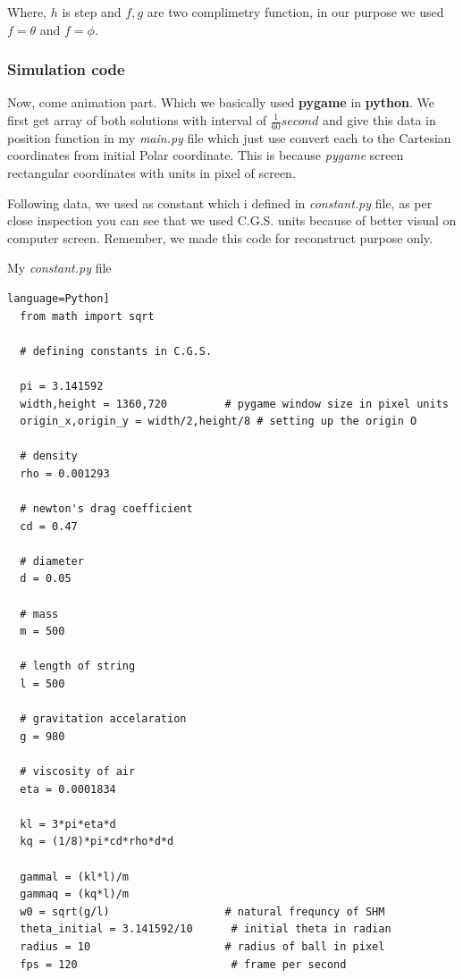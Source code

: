 \documentclass[11pt,a4paper]{article}
\begin{document}
Where, \(h\) is step and \(f,g\) are two complimetry function, in our purpose we used \(f = \theta\) and \(f = \phi\).





\subsubsection{Simulation code}
\label{sec:orga63b9eb}

Now, come animation part. Which we basically used \textbf{pygame} in \textbf{python}. We first get array of both solutions with interval of \(\frac{1}{60} second\) and give this data in position function in my \emph{main.py} file which just use convert each to the Cartesian coordinates from initial Polar coordinate. This is because \emph{pygame} screen rectangular coordinates with units in pixel of screen.

Following data, we used as constant which i defined in \emph{constant.py} file, as per close inspection you can see that we used C.G.S. units because of better visual on computer screen. Remember, we made this code for reconstruct purpose only.

My \emph{constant.py} file

\begin{lstlisting}language=Python]
  from math import sqrt

  # defining constants in C.G.S.

  pi = 3.141592
  width,height = 1360,720         # pygame window size in pixel units
  origin_x,origin_y = width/2,height/8 # setting up the origin O

  # density
  rho = 0.001293

  # newton's drag coefficient
  cd = 0.47

  # diameter
  d = 0.05

  # mass 
  m = 500

  # length of string
  l = 500

  # gravitation accelaration
  g = 980

  # viscosity of air
  eta = 0.0001834

  kl = 3*pi*eta*d
  kq = (1/8)*pi*cd*rho*d*d

  gammal = (kl*l)/m
  gammaq = (kq*l)/m
  w0 = sqrt(g/l)                  # natural frequncy of SHM
  theta_initial = 3.141592/10      # initial theta in radian
  radius = 10                     # radius of ball in pixel
  fps = 120                        # frame per second



\end{lstlisting}
\end{document}
